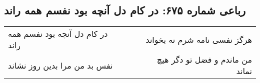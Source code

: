 \begin{center}
\section*{رباعی شماره ۶۷۵: در کام دل آنچه بود نفسم همه راند}
\label{sec:0675}
\begin{longtable}{l p{0.5cm} r}
در کام دل آنچه بود نفسم همه راند
&&
هرگز نفسی نامه شرم نه بخواند
\\
نفس بد من مرا بدین روز نشاند
&&
من ماندم و فضل تو دگر هیچ نماند
\\
\end{longtable}
\end{center}
